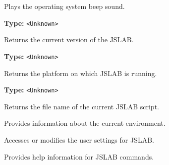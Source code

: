 \documentclass[12pt,a4paper]{article}
\begin{document}
\noindent Plays the operating system beep sound.

\vspace{5mm}
\noindent {}\vspace{4mm}


\noindent \textbf{Type:} \texttt{<Unknown>}

\noindent Returns the current version of the JSLAB.

\vspace{5mm}
\noindent {}\vspace{4mm}


\noindent \textbf{Type:} \texttt{<Unknown>}

\noindent Returns the platform on which JSLAB is running.

\vspace{5mm}
\noindent {}\vspace{4mm}


\noindent \textbf{Type:} \texttt{<Unknown>}

\noindent Returns the file name of the current JSLAB script.

\vspace{5mm}
\noindent {}


\noindent Provides information about the current environment.

\vspace{5mm}
\noindent {}


\noindent Accesses or modifies the user settings for JSLAB.

\vspace{5mm}
\noindent {}


\noindent Provides help information for JSLAB commands.

\vspace{5mm}
\noindent {}
\end{document}
